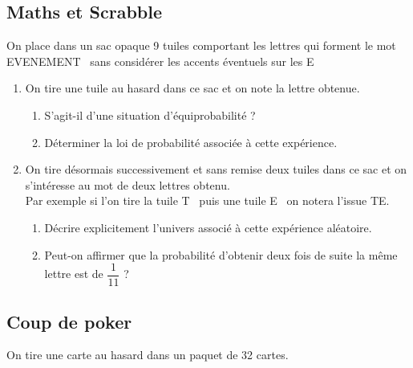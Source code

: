 \documentclass[oneside,12pt]{article}          %
\begin{document}
\subsection{Maths et Scrabble}
On place dans un sac opaque 9 tuiles comportant les lettres qui forment le mot \og EVENEMENT \fg \, sans considérer les accents éventuels sur les \og E \fg
\begin{enumerate}
	\item On tire une tuile au hasard dans ce sac et on note la lettre obtenue.
	\begin{enumerate}
		\item S'agit-il d'une situation d'équiprobabilité ?
		\item Déterminer la loi de probabilité associée à cette expérience.
	\end{enumerate}
	\item On tire désormais successivement et sans remise deux tuiles dans ce sac et on s'intéresse au mot de deux lettres obtenu.\\
	Par exemple si l'on tire la tuile \og T \fg \, puis une tuile \og E \fg \, on notera l'issue TE.
	\begin{enumerate}
		\item Décrire explicitement l'univers associé à cette expérience aléatoire.
		\item Peut-on affirmer que la probabilité d'obtenir deux fois de suite la même lettre est de $\dfrac{1}{11}$ ?
	\end{enumerate}
\end{enumerate}



\subsection{Coup de poker}
On tire une carte au hasard dans un paquet de 32 cartes.
\end{document}
